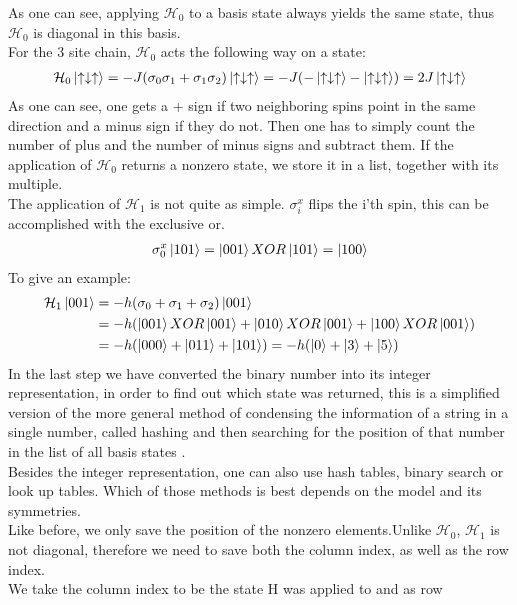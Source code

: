 \documentclass{article}
\begin{document}
As one can see, applying $\mathcal{H}_0$ to a basis state always yields the same state, thus $\mathcal{H}_0$ is diagonal in this basis.\\
For the 3 site chain, $\mathcal{H}_0$ acts the following way on a state:
\begin{align*}
\mathcal{H}_0 \ket{\uparrow \downarrow \uparrow} = -J(\sigma_0\sigma_1 + \sigma_1\sigma_2) \ket{\uparrow \downarrow \uparrow} = -J(-\ket{\uparrow \downarrow \uparrow} - \ket{\uparrow \downarrow \uparrow}) = 2J \ket{\uparrow \downarrow \uparrow}
\end{align*}
As one can see, one gets a + sign if two neighboring spins point in the same direction and a minus sign if they do not. Then one has to simply count the number of plus and the number of minus signs and subtract them.
If the application of $\mathcal{H}_0$ returns a nonzero state, we store it in a list, together with its multiple.\\
The application of $\mathcal{H}_1$  is not quite as simple. $\sigma_i^x$ flips the i'th spin, this can be accomplished with the exclusive or.
\begin{align*}
\sigma_0^x \ket{101} = \ket{001} XOR \ket{101} = \ket{100}
\end{align*}
To give an example:
\begin{align*}
\mathcal{H}_1 \ket{001} &= -h(\sigma_0 + \sigma_1 + \sigma_2)\ket{001} \\
&= -h(\ket{001}XOR \ket{001} + \ket{010}XOR \ket{001} + \ket{100}XOR \ket{001})\\
&= -h(\ket{000} +\ket{011} +\ket{101}) = -h(\ket{0} + \ket{3} +\ket{5})
\end{align*}
In the last step we have converted the binary number into its integer
representation, in order to find out which state was returned, this is
a simplified version of the more general method of condensing the
information of a string in a single number, called hashing and then searching for the
position of that number in the list of all basis states \cite{Zhang}.\\
Besides the integer representation, one can also use hash tables, binary search or look up tables. Which of those methods is best depends on the model and its symmetries.\\
Like before, we only save the position of the nonzero elements.Unlike $\mathcal{H}_0$, $\mathcal{H}_1$ is not diagonal, therefore we need to save both the column index, as well as the row index.\\
We take the column index to be the state H was applied to and as row
\end{document}
